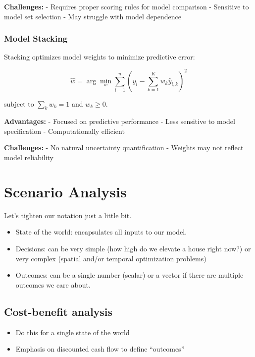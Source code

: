 \documentclass[
  letterpaper,
  DIV=11,
  numbers=noendperiod]{scrreprt}
\providecommand{\tightlist}{%
  \setlength{\itemsep}{0pt}\setlength{\parskip}{0pt}}
\begin{document}
\textbf{Challenges:} - Requires proper scoring rules for model
comparison - Sensitive to model set selection - May struggle with model
dependence

\subsubsection{Model Stacking}\label{model-stacking-1}

Stacking optimizes model weights to minimize predictive error:

\[
\hat{w} = \arg\min_w \sum_{i=1}^n \left( y_i - \sum_{k=1}^K w_k \hat{y}_{i,k} \right)^2
\]

subject to \(\sum_k w_k = 1\) and \(w_k \geq 0\).

\textbf{Advantages:} - Focused on predictive performance - Less
sensitive to model specification - Computationally efficient

\textbf{Challenges:} - No natural uncertainty quantification - Weights
may not reflect model reliability

\section{Scenario Analysis}\label{scenario-analysis}

Let's tighten our notation just a little bit.

\begin{itemize}
\tightlist
\item
  State of the world: encapsulates all inputs to our model.
\item
  Decisions: can be very simple (how high do we elevate a house right
  now?) or very complex (spatial and/or temporal optimization problems)
\item
  Outcomes: can be a single number (scalar) or a vector if there are
  multiple outcomes we care about.
\end{itemize}

\subsection{Cost-benefit analysis}\label{cost-benefit-analysis-1}

\begin{itemize}
\tightlist
\item
  Do this for a single state of the world
\item
  Emphasis on discounted cash flow to define ``outcomes''
\end{itemize}
\end{document}
